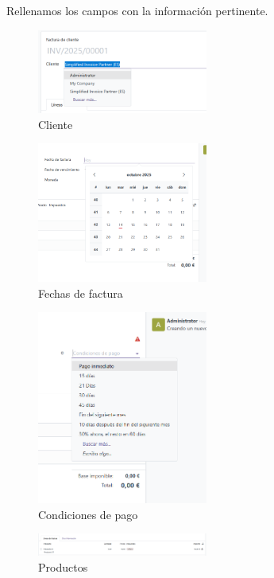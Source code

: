 \documentclass[a4paper,12pt]{article}
\begin{document}
Rellenamos los campos con la información pertinente.

\begin{figure}[h!]
    \centering
    \includegraphics[width=0.5\textwidth]{pr2odoo03-facturac01.png}
    \caption{Cliente}
\end{figure}
\FloatBarrier

\begin{figure}[h!]
    \centering
    \includegraphics[width=0.5\textwidth]{pr2odoo04-facturac02.png}
    \caption{Fechas de factura}
\end{figure}
\FloatBarrier

\begin{figure}[h!]
    \centering
    \includegraphics[width=0.5\textwidth]{pr2odoo05-facturac03.png}
    \caption{Condiciones de pago}
\end{figure}
\FloatBarrier

\begin{figure}[h!]
    \centering
    \includegraphics[width=0.5\textwidth]{pr2odoo06-facturac04.png}
    \caption{Productos}
\end{figure}
\FloatBarrier
\end{document}
